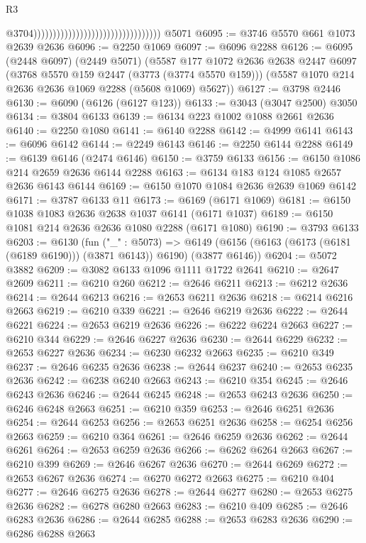 \begin{lexlean}{R3}
\begin{coremodule}
                                                                      @3704)))))))))))))))))))))))))))))))))
    @5071
@6095 := @3746 @5570 @661 @1073 @2639 @2636
@6096 := @2250 @1069
@6097 := @6096 @2288
@6126 := @6095
    (@2448 @6097)
    (@2449 @5071)
    (@5587
      @177
      @1072
      @2636
      @2638
      @2447
      @6097
      (@3768 @5570 @159 @2447 (@3773 (@3774 @5570 @159)))
      (@5587 @1070 @214 @2636 @2636 @1069 @2288 (@5608 @1069) @5627))
@6127 := @3798 @2446
@6130 := @6090 (@6126 (@6127 @123))
@6133 := @3043 (@3047 @2500) @3050
@6134 := @3804 @6133
@6139 := @6134 @223 @1002 @1088 @2661 @2636
@6140 := @2250 @1080
@6141 := @6140 @2288
@6142 := @4999 @6141
@6143 := @6096 @6142
@6144 := @2249 @6143
@6146 := @2250 @6144 @2288
@6149 := @6139 @6146 (@2474 @6146)
@6150 := @3759 @6133
@6156 := @6150 @1086 @214 @2659 @2636 @6144 @2288
@6163 := @6134 @183 @124 @1085 @2657 @2636 @6143 @6144
@6169 := @6150 @1070 @1084 @2636 @2639 @1069 @6142
@6171 := @3787 @6133 @11
@6173 := @6169 (@6171 @1069)
@6181 := @6150 @1038 @1083 @2636 @2638 @1037 @6141 (@6171 @1037)
@6189 := @6150 @1081 @214 @2636 @2636 @1080 @2288 (@6171 @1080)
@6190 := @3793 @6133
@6203 := @6130
    (fun ("_" : @5073) =>
    @6149 (@6156 (@6163 (@6173 (@6181 (@6189 @6190))) (@3871 @6143)) @6190) (@3877 @6146))
@6204 := @5072 @3882
@6209 := @3082 @6133 @1096 @1111 @1722 @2641
@6210 := @2647 @2609
@6211 := @6210 @260
@6212 := @2646 @6211
@6213 := @6212 @2636
@6214 := @2644 @6213
@6216 := @2653 @6211 @2636
@6218 := @6214 @6216 @2663
@6219 := @6210 @339
@6221 := @2646 @6219 @2636
@6222 := @2644 @6221
@6224 := @2653 @6219 @2636
@6226 := @6222 @6224 @2663
@6227 := @6210 @344
@6229 := @2646 @6227 @2636
@6230 := @2644 @6229
@6232 := @2653 @6227 @2636
@6234 := @6230 @6232 @2663
@6235 := @6210 @349
@6237 := @2646 @6235 @2636
@6238 := @2644 @6237
@6240 := @2653 @6235 @2636
@6242 := @6238 @6240 @2663
@6243 := @6210 @354
@6245 := @2646 @6243 @2636
@6246 := @2644 @6245
@6248 := @2653 @6243 @2636
@6250 := @6246 @6248 @2663
@6251 := @6210 @359
@6253 := @2646 @6251 @2636
@6254 := @2644 @6253
@6256 := @2653 @6251 @2636
@6258 := @6254 @6256 @2663
@6259 := @6210 @364
@6261 := @2646 @6259 @2636
@6262 := @2644 @6261
@6264 := @2653 @6259 @2636
@6266 := @6262 @6264 @2663
@6267 := @6210 @399
@6269 := @2646 @6267 @2636
@6270 := @2644 @6269
@6272 := @2653 @6267 @2636
@6274 := @6270 @6272 @2663
@6275 := @6210 @404
@6277 := @2646 @6275 @2636
@6278 := @2644 @6277
@6280 := @2653 @6275 @2636
@6282 := @6278 @6280 @2663
@6283 := @6210 @409
@6285 := @2646 @6283 @2636
@6286 := @2644 @6285
@6288 := @2653 @6283 @2636
@6290 := @6286 @6288 @2663

\end{coremodule}
\end{lexlean}
